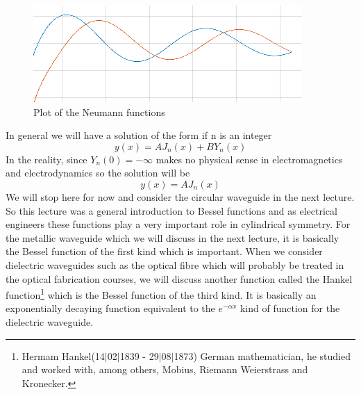 \begin{figure}[H]
\centering
\includegraphics[width=0.7\linewidth]{"./graphics/fig 11_3"}
\caption{ Plot of the Neumann functions}
\label{fig:fig-3}
\end{figure}
In general we will have a solution of the form if n is an integer
$$y(x) = AJ_n(x) + B Y_n(x)$$
In the reality, since $Y_n(0) = -\infty$ makes no physical sense in electromagnetics and electrodynamics so the solution will be 
$$y(x) = AJ_n(x)$$
We will stop here for now and consider the circular waveguide in the next lecture. So this lecture was a general introduction to Bessel functions and as electrical engineers these functions play a very important role in cylindrical symmetry. For the metallic waveguide which we will discuss in the next lecture, it is basically the Bessel function of the first kind which is important. When we consider dielectric waveguides such as the optical fibre which will probably be treated in the optical fabrication courses, we will discuss another function called the Hankel function\footnote{Hermam Hankel(14$|$02$|$1839 - 29$|$08$|$1873) German mathematician, he studied and worked with, among others, Mobius, Riemann Weierstrass and Kronecker.} which is the Bessel function of the third kind. It is basically an exponentially decaying function equivalent to the $e^{-\alpha x}$ kind of function for the dielectric waveguide.
